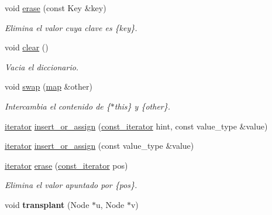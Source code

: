 \begin{DoxyCompactItemize}
\item 
void \hyperlink{classaed2_1_1map_a2ffadb42cd5f0bc7b3752ff159b75334}{erase} (const \-Key \&key)
\begin{DoxyCompactList}\small\item\em \-Elimina el valor cuya clave es \{key\}. \end{DoxyCompactList}\item 
void \hyperlink{classaed2_1_1map_a2bfa5165825979bf2431db55bc6bc9ca}{clear} ()
\begin{DoxyCompactList}\small\item\em \-Vacia el diccionario. \end{DoxyCompactList}\item 
void \hyperlink{classaed2_1_1map_a43ddb71cc91e5c6021a7a1f243d6cc4a}{swap} (\hyperlink{classaed2_1_1map}{map} \&other)
\begin{DoxyCompactList}\small\item\em \-Intercambia el contenido de \{$\ast$this\} y \{other\}. \end{DoxyCompactList}\item 
\hyperlink{classaed2_1_1map_1_1iterator}{iterator} \hyperlink{classaed2_1_1map_a2ef6723c183916276b0afc4a4c721475}{insert\-\_\-or\-\_\-assign} (\hyperlink{classaed2_1_1map_1_1const__iterator}{const\-\_\-iterator} hint, const value\-\_\-type \&value)
\item 
\hyperlink{classaed2_1_1map_1_1iterator}{iterator} \hyperlink{classaed2_1_1map_a9128a806713bcc999ebd8a97ab77e765}{insert\-\_\-or\-\_\-assign} (const value\-\_\-type \&value)
\item 
\hyperlink{classaed2_1_1map_1_1iterator}{iterator} \hyperlink{classaed2_1_1map_ad8e796bf9c9c558e5ce6b61e116253fe}{erase} (\hyperlink{classaed2_1_1map_1_1const__iterator}{const\-\_\-iterator} pos)
\begin{DoxyCompactList}\small\item\em \-Elimina el valor apuntado por \{pos\}. \end{DoxyCompactList}\item 
\hypertarget{classaed2_1_1map_a98b9f200c64ce02dfb67902ee00e375a}{void {\bfseries transplant} (\-Node $\ast$u, \-Node $\ast$v)}\label{classaed2_1_1map_a98b9f200c64ce02dfb67902ee00e375a}

\end{DoxyCompactItemize}
